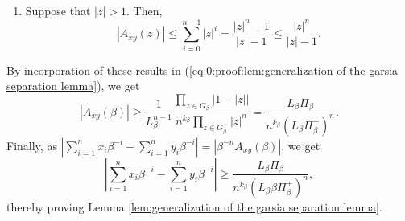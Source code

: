 \begin{enumerate}[label=(\alph*)]
\begin{enumerate}[label=(\roman*)]
    \item Suppose that $|z| > 1$. Then,
    \begin{equation}
        |A_{xy}(z)| \leq \sum_{i=0}^{n-1} |z|^i = \frac{|z|^n-1}{|z|-1} \leq \frac{|z|^n}{|z|-1}.
    \end{equation}
\end{enumerate}
By incorporation of these results in (\ref{eq:0:proof:lem:generalization of the garsia separation lemma}), we get
\begin{equation}
    |A_{xy}(\beta)| \geq \frac{1}{L_\beta^{n-1}}  \frac{\prod_{z \in G_\beta} |1-|z||}{n^{k_\beta}\prod_{z \in G^+_\beta} |z|^n} = \frac{L_\beta\Pi_\beta}{n^{k_\beta} (L_\beta \Pi_\beta^+)^n}.
\end{equation}
Finally, as $\left|\sum_{i=1}^n x_i \beta^{-i} - \sum_{i=1}^n y_i \beta^{-i}\right| = |\beta^{-n}A_{xy}(\beta)|$, we get
\begin{equation}
    \left|\sum_{i=1}^n x_i \beta^{-i} - \sum_{i=1}^n y_i \beta^{-i}\right| \geq \frac{L_\beta\Pi_\beta}{n^{k_\beta} (L_\beta \beta \Pi_\beta^+)^n},
\end{equation}
thereby proving Lemma \ref{lem:generalization of the garsia separation lemma}.
\end{enumerate}